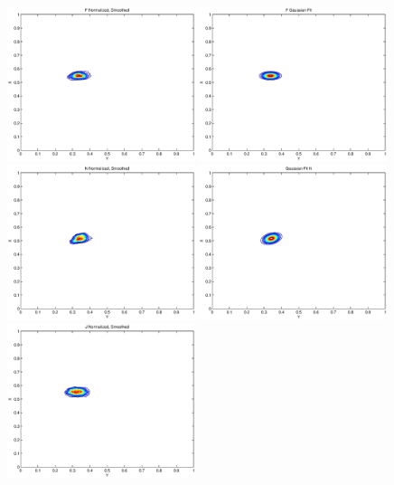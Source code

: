 \begin{figure}[h!]
  \centering
    \includegraphics[width=0.49\textwidth]{Chapter2/Figs/FHands_XY_fBin.eps}
    \includegraphics[width=0.49\textwidth]{Chapter2/Figs/FHands_XY_gFit.eps}
    \includegraphics[width=0.49\textwidth]{Chapter2/Figs/NHands_XY_fBin.eps}
    \includegraphics[width=0.49\textwidth]{Chapter2/Figs/NHands_XY_gFit.eps}
    \includegraphics[width=0.49\textwidth]{Chapter2/Figs/JHands_XY_fBin.eps}

\end{figure}
